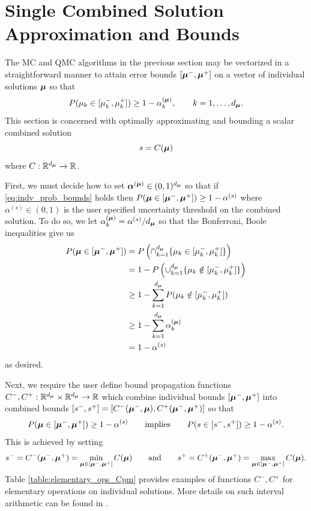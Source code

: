 \documentclass{article}[12pt]
\begin{document}
\section{Single Combined Solution Approximation and Bounds}

The MC and QMC algorithms in the previous section may be vectorized in a straightforward manner to attain error bounds $[\boldsymbol{\mu}^-,\boldsymbol{\mu}^+]$ on a vector of individual solutions $\boldsymbol{\mu}$ so that 
\begin{equation}
    P(\mu_k \in [\mu_k^-,\mu_k^+]) \geq 1-\alpha_k^{(\boldsymbol{\mu})},  \qquad k=1,\dots,d_{\boldsymbol{\mu}}.
    \label{eq:indv_prob_bounds}
\end{equation}
This section is concerned with optimally approximating and bounding a scalar combined solution 
$$s=C(\boldsymbol{\mu})$$
where $C: \mathbb{R}^{d_{\boldsymbol{\mu}}} \to \mathbb{R}$. 

First, we  must decide how to set $\boldsymbol{\alpha}^{(\boldsymbol{\mu})} \in (0,1)^{d_{\boldsymbol{\mu}}}$ so that if \eqref{eq:indv_prob_bounds} holds then $P(\boldsymbol{\mu} \in [\boldsymbol{\mu}^-,\boldsymbol{\mu}^+]) \geq 1-\alpha^{(s)}$ where $\alpha^{(s)} \in (0,1)$ is the user specified uncertainty threshold on the combined solution. To do so, we let $\alpha_k^{(\boldsymbol{\mu})} = \alpha^{(s)}/d_{\boldsymbol{\mu}}$ so that the Bonferroni, Boole inequalities give us 
\begin{align*}
    P(\boldsymbol{\mu} \in [\boldsymbol{\mu}^-,\boldsymbol{\mu}^+])
    &= P\left(\cap_{k=1}^{d_{\boldsymbol{\mu}}} \{\mu_k \in [\mu^-_k,\mu^+_k]\}\right) \\
    &= 1-P\left(\cup_{k=1}^{d_{\boldsymbol{\mu}}} \{\mu_k \notin [\mu^-_k,\mu^+_k]\}\right) \\
    &\geq 1-\sum_{k=1}^{d_{\boldsymbol{\mu}}} P(\mu_k \notin [\mu_k^-,\mu_k^+]) \\
    &\geq 1-\sum_{k=1}^{d_{\boldsymbol{\mu}}} \alpha_k^{(\boldsymbol{\mu})} \\
    &= 1-\alpha^{(s)}
\end{align*}
as desired. 

Next, we require the user define bound propagation functions $C^-,C^+: \mathbb{R}^{d_{\boldsymbol{\mu}}} \times \mathbb{R}^{d_{\boldsymbol{\mu}}} \to \mathbb{R}$ which combine individual bounds $[\boldsymbol{\mu}^-,\boldsymbol{\mu}^+]$ into combined bounds $[s^-,s^+] = [C^-(\boldsymbol{\mu}^-,\boldsymbol{\mu}),C^+(\boldsymbol{\mu}^-,\boldsymbol{\mu}^+)]$ so that 
$$P(\boldsymbol{\mu} \in [\boldsymbol{\mu}^-,\boldsymbol{\mu}^+]) \geq 1-\alpha^{(s)} \qquad\text{implies}\qquad  P(s \in [s^-,s^+]) \geq 1-\alpha^{(s)}.$$ This is achieved by setting
\begin{equation*}
    s^- = C^-(\boldsymbol{\mu}^-,\boldsymbol{\mu}^+) = \min_{\boldsymbol{\mu} \in [\boldsymbol{\mu}^-,\boldsymbol{\mu}^+]} C(\boldsymbol{\mu}) \qquad\text{and}\qquad s^+ = C^+(\boldsymbol{\mu}^-,\boldsymbol{\mu}^+) = \max_{\boldsymbol{\mu} \in [\boldsymbol{\mu}^-,\boldsymbol{\mu}^+]} C(\boldsymbol{\mu}).
\end{equation*}
Table \ref{table:elementary_ops_Cpm} provides examples of functions $C^-,C^+$ for elementary operations on individual solutions. More details on such interval arithmetic can be found in \cite{interval_analysis}.
 
\end{document}
